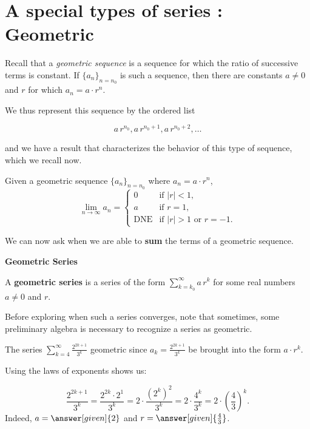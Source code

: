 \documentclass{ximera}
\begin{document}
\section{A special types of series : Geometric}



Recall that a \emph{geometric sequence} is a sequence for which the ratio of successive terms is constant.  If $\{a_n\}_{n=n_0}$ is such a sequence, then there are constants $a \ne 0$ and $r$ for which $a_n = a\cdot r^n$.  

We thus represent this sequence by the ordered list

\[
a \, r^{n_0} , a \, r^{n_0+1}, a \, r^{n_0+2}, \ldots
\]

and we have a result that characterizes the behavior of this type of sequence, which we recall now.


\begin{theorem}
  Given a geometric sequence $\{a_n\}_{n=n_0}$ where $a_n = a \cdot r^{n}$,
  \[
  \lim_{n\to\infty} a_n =
  \begin{cases}
    0 &\text{if $|r|<1$,}\\
    a &\text{if $r=1$,}\\
    \text{DNE} &\text{if $|r|>1$ or $r=-1$.}
  \end{cases}
  \]
\end{theorem}

We can now ask when we are able to \textbf{\textcolor{purple!85!blue}{sum}} the terms of a geometric sequence.

\begin{definition}  \textbf{\textcolor{green!50!black}{Geometric Series}} 


  A \textbf{geometric series} is a series of the form $\sum\limits_{k=k_0}^\infty a \, r^k$
  for some real numbers $a \ne 0$ and $r$.
\end{definition}

Before exploring when such a series converges, note that sometimes, some preliminary algebra is necessary to recognize a series as geometric.

\begin{example}
The series $\sum\limits_{k=4}^\infty \frac{2^{2k+1}}{3^k}$  geometric since $a_k =\frac{2^{2k+1}}{3^k}$  be brought into the form $a \cdot r^k$.  

Using the laws of exponents shows us:

\[
\frac{2^{2k+1}}{3^k} = \frac{2^{2k} \cdot 2^1}{3^k}= 2 \cdot \frac{\left(2^{k}\right)^2}{3^k} = 2 \cdot \frac{4^k}{3^k} = 2 \cdot \left(\frac{4}{3}\right)^k.
\]
Indeed, $a= \answer[given]{2}$ and $r = \answer[given]{\frac{4}{3}}$.
\end{example}
\end{document}
